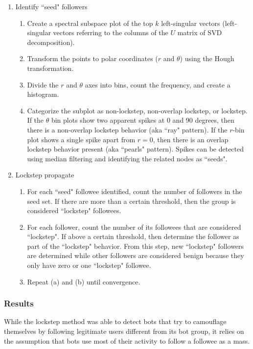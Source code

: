 \documentclass[11pt, oneside]{article}   	%
\begin{document}
\begin{enumerate}
	\item Identify ``seed" followers
	\begin{enumerate}
		\item Create a spectral subspace plot of the top $k$ left-singular vectors (left-singular vectors referring to the columns of the $U$ matrix of SVD decomposition).
		\item Transform the points to polar coordinates ($r$ and $\theta$) using the Hough transformation.
		\item Divide the $r$ and $\theta$ axes into bins, count the frequency, and create a histogram.
		\item Categorize the subplot as non-lockstep, non-overlap lockstep, or lockstep.
		If the $\theta$ bin plots show two apparent spikes at 0 and 90 degrees, then there is a non-overlap lockstep behavior (aka ``ray" pattern).
		If the $r$-bin plot shows a single spike apart from $r = 0$, then there is an overlap lockstep behavior present (aka ``pearls" pattern).
		Spikes can be detected using median filtering and identifying the related nodes as ``seeds".
	\end{enumerate}
	\item Lockstep propagate
	\begin{enumerate}
		\item For each ``seed" followee identified, count the number of followers in the seed set.
		If there are more than a certain threshold, then the group is considered ``lockstep" followees.
		\item For each follower, count the number of its followees that are considered ``lockstep".
		If above a certain threshold, then determine the follower as part of the ``lockstep" behavior.
		From this step, new ``lockstep" followers are determined while other followers are considered benign because they only have zero or one ``lockstep" followee.
		\item Repeat (a) and (b) until convergence.
	\end{enumerate}
\end{enumerate}

\subsubsection*{Results}

\quad While the lockstep method was able to detect bots that try to camouflage themselves by following legitimate users different from its bot group, it relies on the assumption that bots use most of their activity to follow a followee as a mass.
\end{document}
